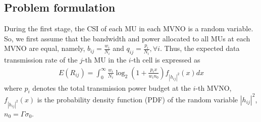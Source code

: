 \documentclass[journal]{IEEEtran}
\begin{document}
\subsection{Problem formulation}
\begin{framed}
	During the first stage, the CSI of each MU in each MVNO is a random variable. So, we first assume that the bandwidth and power allocated to all MUs at each MVNO are equal, namely, $b_{ij} = \frac{w_i}{N_i}$ and $q_{ij} = \frac{p_i}{N_i}, \forall i$. Thus, the expected data transmission rate of the $j$-th MU in the $i$-th cell is expressed as
	\begin{align}
	E\left({R}_{ij}\right) = \int_{0}^{\infty} \frac{w_i}{N_i} \log_2\left(1 + \frac{p_i x}{w_i n_0}\right) f_{\left|h_{ij} \right|^2} \left(x\right)dx
	\end{align}
	where $p_i$ denotes the total transmission power budget at the $i$-th MVNO, $f_{\left|h_{ij} \right|^2} \left(x\right)$ is the probability density function (PDF) of the random variable $\left|h_{ij} \right|^2$, $n_0 = \Gamma \sigma_0$. 
\end{framed}
{\color{red}{Please change the text in the box above as follows:}}
\end{document}

